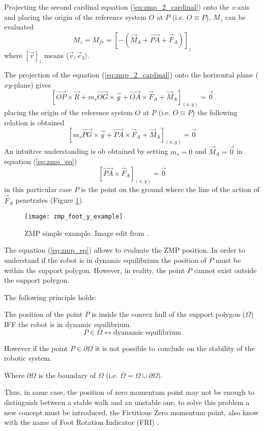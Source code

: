 Projecting the second cardinal equation (\ref{eq:zmp_2_cardinal}) onto the $z$-axis and placing the
origin of the reference system $O$ at $P$ (i.e. $O \equiv P$), $M_z$ can be evaluated
\[
M_z = M_{fr} = [-(\vec{M}_A + \vec{PA} + \vec{F}_A)]_z
\]
where $[\vec{v}]_z$ means $\langle \vec{v},\vec{e}_3 \rangle$.
\par
The projection of the equation (\ref{eq:zmp_2_cardinal}) onto the horizontal plane ($xy$-plane) gives
\[
\left[\vec{OP} \times \vec{R} + m_s \vec{OG} \times \vec{g} + \vec{OA} \times \vec{F}_A + \vec{M}_A\right]_{(x,y)} = \vec{0}
\]
placing the origin of the reference system $O$ at $P$ (i.e. $O \equiv P$) the following relation is
obtained
\begin{equation}
  \label{eq:zmp_eq}
  \left[ m_s \vec{PG} \times \vec{g} + \vec{PA} \times \vec{F}_A + \vec{M}_A\right]_{(x,y)} = \vec{0}
\end{equation}
An intuitive understanding is ob obtained by setting $m_s = 0$ and $\vec{M}_A = \vec{0}$ in equation
(\ref{eq:zmp_eq})
\[
\left[\vec{PA} \times \vec{F}_A\right]_{(x,y)} = \vec{0}
\]
in this particular case $P$ is the point on the ground where the line of the action of $\vec{F}_A$
penetrates (Figure \ref{fig:zmp_foot_y_example}).
\begin{figure}[!ht]
  \centering
  \texttt{[image: zmp\_foot\_y\_example]}
  \caption{ZMP simple example. Image edit from \cite{Vukobratov2004}. \label{fig:zmp_foot_y_example}}
\end{figure}
The equation (\ref{eq:zmp_eq}) allows to evaluate the ZMP position. In order to understand if the robot
is in dynamic equilibrium the position of $P$ must be within the support polygon. However, in reality, the
point $P$ cannot exist outside the support polygon.
\par
The following principle holds:
\begin{principle}
  The position of the point $P$ is inside the convex hull of the support polygon ($\Omega$)
  IFF the robot is in dynamic equilibrium.
  \[
  P \in \Omega \longleftrightarrow \text{dyanamic equilibrium}
  \]
  \par
  However if the point $P \in \partial \Omega$ it is not possible to conclude on the stability of the robotic system.
  \par
  Where $\partial \Omega$ is the boundary of $\Omega$ (i.e. $\bar{\Omega} = \Omega \cup \partial \Omega$).
\end{principle}
Thus, in same case, the position of zero momentum point may not be enough to distinguish between a
stable walk and an unstable one, to solve this problem a new concept must be introduced, the
Fictitious Zero momentum point, also know with the name of Foot Rotation Indicator (FRI)
\cite{Goswami1999}.

